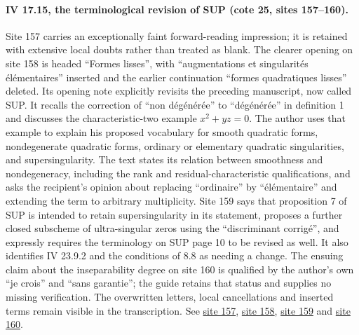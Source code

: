 \documentclass[10pt,a4paper]{article}
\begin{document}
\par{}
\paragraph{IV 17.15, the terminological revision of SUP (cote 25, sites 157--160).}
Site 157 carries an exceptionally faint forward-reading impression; it is retained with extensive local doubts rather than treated as blank. The clearer opening on site 158 is headed ``Formes lisses'', with ``augmentations et singularités élémentaires'' inserted and the earlier continuation ``formes quadratiques lisses'' deleted. Its opening note explicitly revisits the preceding manuscript, now called SUP. It recalls the correction of ``non dégénérée'' to ``dégénérée'' in definition 1 and discusses the characteristic-two example $x^2+yz=0$. The author uses that example to explain his proposed vocabulary for smooth quadratic forms, nondegenerate quadratic forms, ordinary or elementary quadratic singularities, and supersingularity. The text states its relation between smoothness and nondegeneracy, including the rank and residual-characteristic qualifications, and asks the recipient's opinion about replacing ``ordinaire'' by ``élémentaire'' and extending the term to arbitrary multiplicity. Site 159 says that proposition 7 of SUP is intended to retain supersingularity in its statement, proposes a further closed subscheme of ultra-singular zeros using the ``discriminant corrigé'', and expressly requires the terminology on SUP page 10 to be revised as well. It also identifies IV 23.9.2 and the conditions of 8.8 as needing a change. The ensuing claim about the inseparability degree on site 160 is qualified by the author's own ``je crois'' and ``sans garantie''; the guide retains that status and supplies no missing verification. The overwritten letters, local cancellations and inserted terms remain visible in the transcription. See \href{https://grothendieck.umontpellier.fr/web/viewer.html?file=../25.pdf#page=158}{site 157}, \href{https://grothendieck.umontpellier.fr/web/viewer.html?file=../25.pdf#page=159}{site 158}, \href{https://grothendieck.umontpellier.fr/web/viewer.html?file=../25.pdf#page=160}{site 159} and \href{https://grothendieck.umontpellier.fr/web/viewer.html?file=../25.pdf#page=161}{site 160}.
\end{document}
